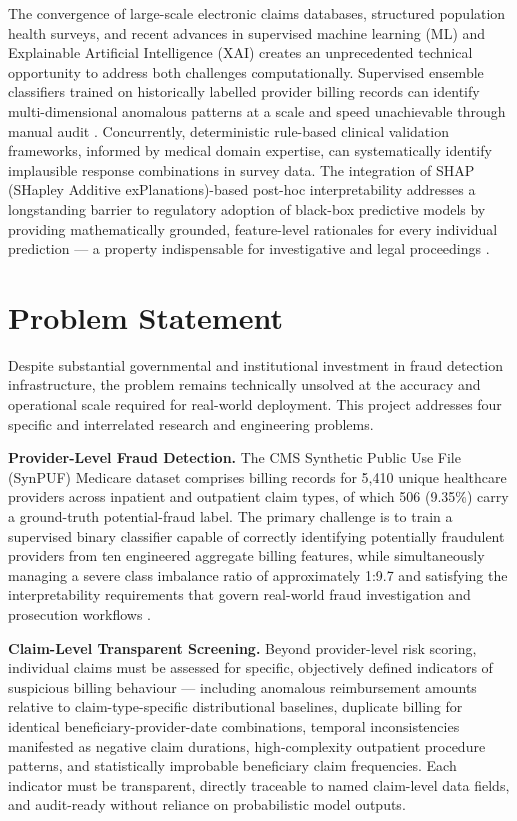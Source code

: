 The convergence of large-scale electronic claims databases, structured population health surveys, and recent advances in supervised machine learning (ML) and Explainable Artificial Intelligence (XAI) creates an unprecedented technical opportunity to address both challenges computationally. Supervised ensemble classifiers trained on historically labelled provider billing records can identify multi-dimensional anomalous patterns at a scale and speed unachievable through manual audit \cite{b18}. Concurrently, deterministic rule-based clinical validation frameworks, informed by medical domain expertise, can systematically identify implausible response combinations in survey data. The integration of SHAP (SHapley Additive exPlanations)-based post-hoc interpretability \cite{b6} addresses a longstanding barrier to regulatory adoption of black-box predictive models by providing mathematically grounded, feature-level rationales for every individual prediction --- a property indispensable for investigative and legal proceedings \cite{b7}.

\section{Problem Statement}
\label{sec:problem}

Despite substantial governmental and institutional investment in fraud detection infrastructure, the problem remains technically unsolved at the accuracy and operational scale required for real-world deployment. This project addresses four specific and interrelated research and engineering problems.

\textbf{Provider-Level Fraud Detection.} The CMS Synthetic Public Use File (SynPUF) Medicare dataset comprises billing records for 5,410 unique healthcare providers across inpatient and outpatient claim types, of which 506 (9.35\%) carry a ground-truth potential-fraud label. The primary challenge is to train a supervised binary classifier capable of correctly identifying potentially fraudulent providers from ten engineered aggregate billing features, while simultaneously managing a severe class imbalance ratio of approximately 1:9.7 and satisfying the interpretability requirements that govern real-world fraud investigation and prosecution workflows \cite{b10}.

\textbf{Claim-Level Transparent Screening.} Beyond provider-level risk scoring, individual claims must be assessed for specific, objectively defined indicators of suspicious billing behaviour --- including anomalous reimbursement amounts relative to claim-type-specific distributional baselines, duplicate billing for identical beneficiary-provider-date combinations, temporal inconsistencies manifested as negative claim durations, high-complexity outpatient procedure patterns, and statistically improbable beneficiary claim frequencies. Each indicator must be transparent, directly traceable to named claim-level data fields, and audit-ready without reliance on probabilistic model outputs.

